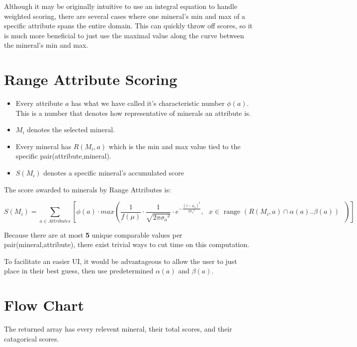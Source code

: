 \documentclass{article}
\newcommand{\p}[2]{pair(#1,#2)}
\def \RangeA{Range Attribute\xspace}
\begin{document}
Although it may be originally intuitive to use an integral equation to handle weighted scoring, there are several cases where one mineral's min and max of a specific attribute spans the entire domain. This can quickly throw off scores, so it is much more beneficial to just use the maximal value along the curve between the mineral's min and max.


\section*{\RangeA Scoring}
\begin{itemize}
\item Every attribute $a$ has what we have called it's characteristic number $\phi(a)$. This is a number that denotes how representative of minerals an attribute is. 
\item $M_i$ denotes the selected mineral.
\item Every mineral has $R(M_i,a)$  which is the min and max value tied to the specific \p{attribute}{mineral}. 
\item $S(M_i)$ denotes a specific mineral's accumulated score
\end{itemize}
The score awarded to minerals by \RangeA{}s is:

\[S(M_i) = \sum_{a\in Attributes} \left[ \phi(a) \cdot max \left(\frac{1}{f(\mu)}\cdot\frac{1}{\sqrt{2\pi{\sigma_a}^2}}\cdot e^{-\frac{(x-\mu_a)^2}{2{\sigma_a}^2}},\textrm{ $x\in$ range $(R(M_i,a) \cap \alpha(a)..\beta(a))$ }\right) \right] \]

Because there are at most {\bf 5} unique comparable values per \p{mineral}{attribute}, there exist trivial ways to cut time on this computation.

To facilitate an easier UI, it would be advantageous to allow the user to just place in their best guess, then use predetermined $\alpha(a)$ and  $\beta(a)$.
\pagebreak
\section*{Flow Chart}
The returned array has every relevent mineral, their total scores, and their catagorical scores.
\end{document}
